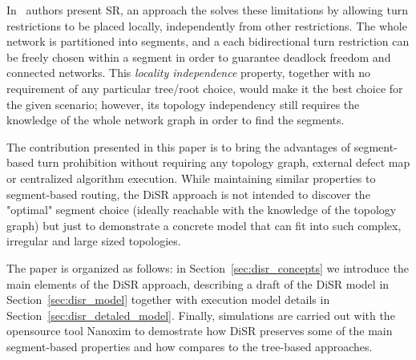 In~\cite{mejia_ipdps06} authors present SR, an approach the solves these
limitations by allowing turn restrictions to be placed locally,
independently from other restrictions. The whole network is
partitioned into segments, and a each bidirectional turn
restriction can be freely chosen within a segment in order to guarantee
deadlock freedom and connected networks. This \emph{locality
independence} property, together with no requirement of any particular tree/root
choice, would make it the best choice for the given scenario;
however, its topology independency still requires the knowledge of the
whole network graph in order to find the segments. 

The contribution presented in this paper is to bring the advantages of
segment-based turn prohibition without requiring any topology graph,
external defect map or centralized algorithm execution.  While
maintaining similar properties to segment-based routing, the DiSR
approach is not intended to discover the "optimal" segment choice
(ideally reachable with the knowledge of the topology graph) but just
to demonstrate a concrete model that can fit into such complex,
irregular and large sized topologies.

The paper is organized as follows: in Section~\ref{sec:disr_concepts}
we introduce the main elements of the DiSR approach, describing  
a draft of the DiSR model in Section~\ref{sec:disr_model}
together with execution model details in Section~\ref{sec:disr_detaled_model}.
Finally, simulations are carried out with the opensource tool Nanoxim
to demostrate how DiSR preserves some of the main segment-based
properties and how compares to the tree-based approaches.


